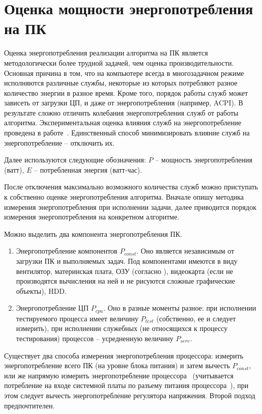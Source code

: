 \section{Оценка мощности энергопотребления на ПК} \label{ch3:sec3}

Оценка энергопотребления реализации алгоритма на ПК является методологически более трудной задачей, чем оценка производительности. Основная причина в том, что на компьютере всегда в многозадачном режиме исполняются различные службы, некоторые из которых потребляют разное количество энергии в разное время. Кроме того, порядок работы служб может зависеть от загрузки ЦП, и даже от энергопотребления (например, ACPI). В результате сложно отличить колебания энергопотребления служб от работы алгоритма. Экспериментальная оценка влияния служб на энергопотребление проведена в работе~\cite{src65}. Единственный способ минимизировать влияние служб на энергопотребление – отключить их.

Далее используются следующие обозначения: $P$ – мощность энергопотребления (ватт), $E$ – потребленная энергия (ватт-час).

После отключения максимально возможного количества служб можно приступать к собственно оценке энергопотребления алгоритма. Вначале опишу методика измерения энергопотребления при исполнении задачи, далее приводится порядок измерения энергопотребления на конкретном алгоритме.

Можно выделить два компонента энергопотребления ПК.
\begin{enumerate}
	\item Энергопотребление компонентов $P_{const}$.  Оно является независимым от загрузки ПК и выполняемых задач. Под компонентами имеются в виду вентилятор, материнская плата, ОЗУ (согласно  ), видеокарта (если не производятся вычисления на ней и не рисуются сложные графические объекты), HDD.
	\item Энергопотребление ЦП $P_{cpu}$. Оно в разные моменты разное: при исполнении тестируемого процесса имеет величину $P_{test}$ (собственно, ее и следует измерить), при исполнении служебных (не относящихся к процессу тестирования) процессов – усредненную величину $P_{serv}$.
\end{enumerate} 

Существует два способа измерения энергопотребления процессора: измерить энергопотребление всего ПК (на уровне блока питания) и затем вычесть $P_{const}$, или же напрямую измерить энергопотребление процессора~\cite{src66,src67} (учитывается потребление на входе системной платы по разъему питания процессора~\cite{src68}), при этом следует вычесть энергопотребление регулятора напряжения. Второй подход предпочтителен.

